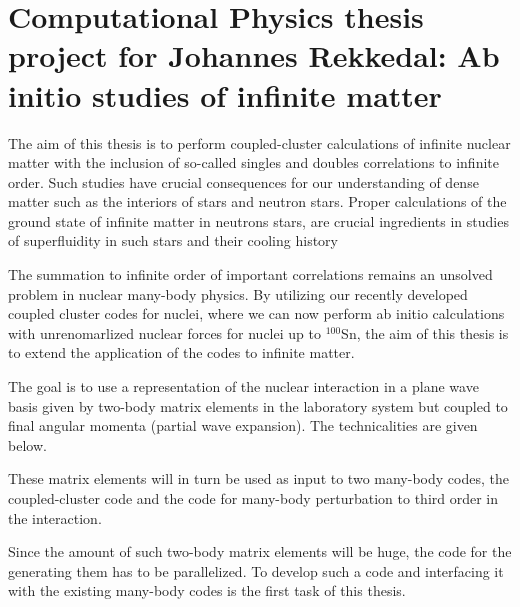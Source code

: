 \newcommand{\OP}[1]{{\bf\widehat{#1}}}

\newcommand{\be}{\begin{equation}}

\newcommand{\ee}{\end{equation}}
\newcommand{\bra}[1]{\left\langle #1 \right|}
\newcommand{\ket}[1]{\left| #1 \right\rangle}
\newcommand{\braket}[2]{\left\langle #1 \right| #2 \right\rangle}




\pagestyle{plain}

\section*{Computational Physics thesis project for Johannes Rekkedal: Ab initio studies of infinite matter}



The aim of this thesis is to perform coupled-cluster calculations of infinite nuclear matter    
with the inclusion of so-called singles and doubles correlations to infinite order. 
Such studies have crucial consequences for our understanding of dense matter such as the interiors of stars
and neutron stars.  Proper calculations of the ground state of infinite matter in neutrons stars,
are crucial ingredients in studies of superfluidity in such stars and their cooling history

The summation to infinite order of important  correlations  remains an unsolved problem in nuclear many-body physics. 
By utilizing our recently developed coupled cluster codes for nuclei, where we can now perform ab initio
calculations with unrenomarlized nuclear forces for nuclei up to $^{100}$Sn, the aim of this thesis is to extend the application
of the codes to infinite matter.

The goal is to use
a representation of the nuclear interaction in a plane wave basis  given by two-body matrix elements 
in the laboratory system but coupled to final angular momenta (partial wave expansion). The technicalities  are given below.

These matrix elements will in turn be used as input to two many-body codes, the coupled-cluster code and the code for many-body perturbation 
to third order in the interaction. 

Since the amount of such two-body matrix elements will be huge, the code for the generating them has to be parallelized.
To develop such a code and interfacing it  with the existing many-body codes is the first task of this thesis.

